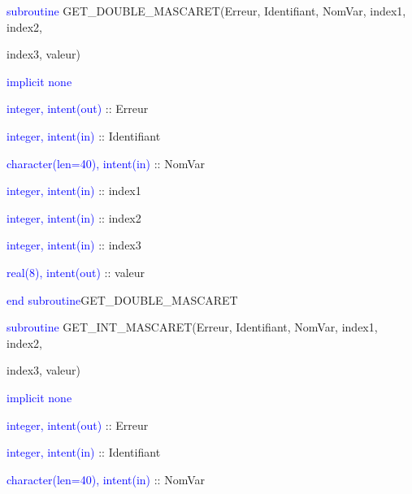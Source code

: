 \documentclass[a4paper,11pt]{article}
\begin{document}
 \vspace{0.5cm}
 
    \textcolor{blue}{subroutine} GET\_DOUBLE\_MASCARET(Erreur, Identifiant, NomVar, index1, index2,
    
     index3, valeur)
    
        \hspace{1cm}\textcolor{blue}{implicit none}                 
        
        \hspace{1cm} \textcolor{blue}{integer, intent(out)} :: Erreur
        
        \hspace{1cm} \textcolor{blue}{integer, intent(in)}  :: Identifiant
        
        \hspace{1cm} \textcolor{blue}{character(len=40), intent(in)}  :: NomVar
        
        \hspace{1cm} \textcolor{blue}{integer, intent(in)}  :: index1
        
        \hspace{1cm} \textcolor{blue}{integer, intent(in)}  :: index2
        
        \hspace{1cm} \textcolor{blue}{integer, intent(in)}  :: index3
        
        \hspace{1cm} \textcolor{blue}{real(8), intent(out)}  :: valeur
        
    \textcolor{blue}{end subroutine}GET\_DOUBLE\_MASCARET

 \vspace{0.5cm}
 

    \textcolor{blue}{subroutine} GET\_INT\_MASCARET(Erreur, Identifiant, NomVar, index1, index2,
    
     index3, valeur)
    
        \hspace{1cm}\textcolor{blue}{implicit none}                 
        
        \hspace{1cm} \textcolor{blue}{integer, intent(out)} :: Erreur
        
        \hspace{1cm} \textcolor{blue}{integer, intent(in)}  :: Identifiant
        
        \hspace{1cm} \textcolor{blue}{character(len=40), intent(in)}  :: NomVar
        
\end{document}
